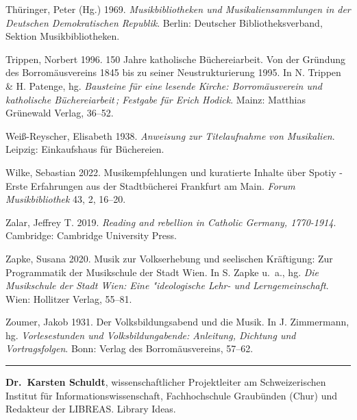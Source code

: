 \documentclass[a4paper,
fontsize=11pt,
oneside,
numbers=noperiodatend,
parskip=half-,
bibliography=totoc,
final
]{scrartcl}
\begin{document}
Thüringer, Peter (Hg.) 1969. \emph{Musikbibliotheken und
Musikaliensammlungen in der Deutschen Demokratischen Republik}. Berlin:
Deutscher Bibliotheksverband, Sektion Musikbibliotheken.

Trippen, Norbert 1996. 150 Jahre katholische Büchereiarbeit. Von der
Gründung des Borromäusvereins 1845 bis zu seiner Neustrukturierung 1995.
In N. Trippen \& H. Patenge, hg. \emph{Bausteine für eine lesende
Kirche: Borromäusverein und katholische Büchereiarbeit\,; Festgabe für
Erich Hodick}. Mainz: Matthias Grünewald Verlag, 36--52.

Weiß-Reyscher, Elisabeth 1938. \emph{Anweisung zur Titelaufnahme von
Musikalien}. Leipzig: Einkaufshaus für Büchereien.

Wilke, Sebastian 2022. Musikempfehlungen und kuratierte Inhalte über
Spotiy - Erste Erfahrungen aus der Stadtbücherei Frankfurt am Main.
\emph{Forum Musikbibliothek} 43, 2, 16--20.

Zalar, Jeffrey T. 2019. \emph{Reading and rebellion in Catholic Germany,
1770-1914}. Cambridge: Cambridge University Press.

Zapke, Susana 2020. Musik zur Volkserhebung und seelischen Kräftigung:
Zur Programmatik der Musikschule der Stadt Wien. In S. Zapke u.~a., hg.
\emph{Die Musikschule der Stadt Wien: Eine "ideologische Lehr- und
Lerngemeinschaft}. Wien: Hollitzer Verlag, 55--81.

Zoumer, Jakob 1931. Der Volksbildungsabend und die Musik. In J.
Zimmermann, hg. \emph{Vorlesestunden und Volksbildungabende: Anleitung,
Dichtung und Vortragsfolgen}. Bonn: Verlag des Borromäusvereins, 57--62.

\begin{center}\rule{0.5\linewidth}{0.5pt}\end{center}

\textbf{Dr.~Karsten Schuldt}, wissenschaftlicher Projektleiter am
Schweizerischen Institut für Informationswissenschaft, Fachhochschule
Graubünden (Chur) und Redakteur der LIBREAS. Library Ideas.
\end{document}

